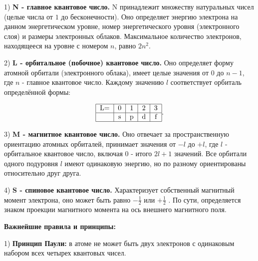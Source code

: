 \par\smallskip

1) \textbf{N - главное квантовое число.}
N принадлежит множеству натуральных чисел (целые числа от $1$ до бесконечности). Оно определяет энергию
электрона на данном энергетическом уровне, номер энергетического уровня (электронного слоя) и размеры электронных облаков. Максимальное количество электронов, находящееся на уровне с номером  $n$, равно $2n^2$.

\par\smallskip

2) \textbf{L - орбитальное (побочное) квантовое число.}
Оно определяет форму атомной орбитали (электронного облака), имеет целые значения от $0$ до $n-1$, где $n$ - главное
квантовое число. Каждому значению $l$ соответствует орбиталь определённой формы:

$$\begin{tabular}[c]{lllll}
	\hline
	\multicolumn{1}{|c|}{L=} & \multicolumn{1}{c|}{0} & \multicolumn{1}{c|}{1} & \multicolumn{1}{c|}{2} & \multicolumn{1}{c|}{3} \\ \hline
	\multicolumn{1}{|c|}{}   & \multicolumn{1}{c|}{s} & \multicolumn{1}{c|}{p} & \multicolumn{1}{c|}{d} & \multicolumn{1}{c|}{f} \\ \hline
	
\end{tabular}.$$

\par\smallskip


3) \textbf{M - магнитное квантовое число.}
Оно отвечает за пространственную ориентацию атомных орбиталей, принимает значения от $-l$ до $+l$, где $l$ -
орбитальное квантовое число, включая $0$ - итого $2l+1$ значений. Все орбитали одного подуровня $l$ имеют одинаковую энергию, но по разному ориентированы относительно друг друга.

\par\smallskip

4) \textbf{S - спиновое квантовое число.}
Характеризует собственный магнитный момент электрона, оно может быть равно $-\frac{1}{2}$ или $+\frac{1}{2}$ . По сути, определяется
знаком проекции магнитного момента на ось внешнего магнитного поля.


\begin{center}
\textbf{Важнейшие правила и принципы:}
\end{center}

1) \textbf{Принцип Паули:} в атоме не может быть двух электронов с одинаковым набором всех четырех квантовых чисел.

